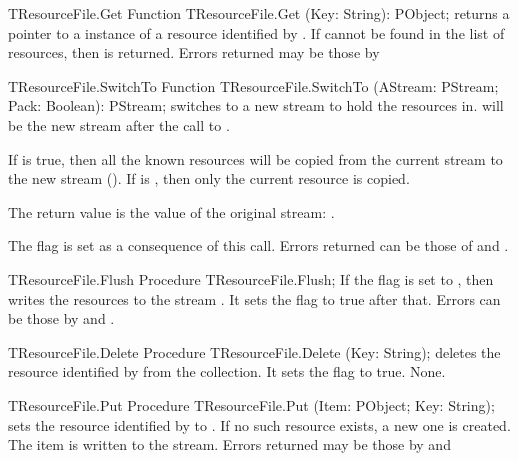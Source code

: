 \begin{function}{TResourceFile.Get}
\Declaration
Function TResourceFile.Get (Key: String): PObject;
\Description
{} returns a pointer to a instance of a resource identified by
. If  cannot be found in the list of resources, then
 is returned.
\Errors
Errors returned may be those by 
\SeeAlso
\end{function}

\begin{function}{TResourceFile.SwitchTo}
\Declaration
Function TResourceFile.SwitchTo (AStream: PStream; Pack: Boolean): PStream;
\Description
{} switches to a new stream to hold the resources in.
 will be the new stream after the call to .

If  is true, then all the known resources will be copied from 
the current stream to the new stream (). If  is 
, then only the current resource is copied.

The return value is the value of the original stream: .

The  flag is set as a consequence of this call.
\Errors
Errors returned can be those of  and
.
\SeeAlso
{}
\end{function}

\begin{procedure}{TResourceFile.Flush}
\Declaration
Procedure TResourceFile.Flush;
\Description
If the  flag is set to , then  
writes the resources to the stream . It sets the 
flag to true after that.
\Errors
Errors can be those by  and .
\SeeAlso
{}
\end{procedure}

\begin{procedure}{TResourceFile.Delete}
\Declaration
Procedure TResourceFile.Delete (Key: String);
\Description
{} deletes the resource identified by  from the
collection. It sets the  flag to true.
\Errors
None.
\SeeAlso
{}
\end{procedure}

\begin{procedure}{TResourceFile.Put}
\Declaration
Procedure TResourceFile.Put (Item: PObject; Key: String);
\Description
{} sets the resource identified by  to .
If no such resource exists, a new one is created. The item is written
to the stream.
\Errors
Errors returned may be those by  and 
\SeeAlso
{}
\end{procedure}


